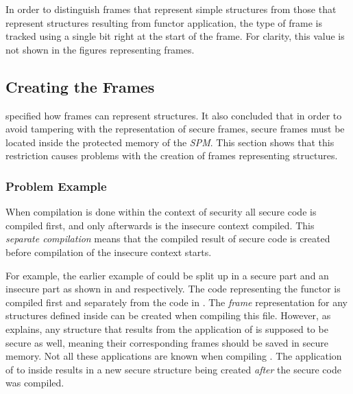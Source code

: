 In order to distinguish frames that represent simple structures from those that represent structures resulting from functor application, the type of frame is tracked using a single bit right at the start of the frame.
For clarity, this value is not shown in the figures representing frames.

\subsection{Creating the Frames}
\label{sec:creatingframes}
 specified how frames can represent structures.
It also concluded that in order to avoid tampering with the representation of secure frames, secure frames must be located inside the protected memory of the \emph{SPM}.
This section shows that this restriction causes problems with the creation of frames representing structures.

\subsubsection{Problem Example}
When compilation is done within the context of security all secure code is compiled first, and only afterwards is the insecure context compiled.
This \emph{separate compilation} means that the compiled result of secure code is created before compilation of the insecure context starts.

For example, the earlier example of  could be split up in a secure part and an insecure part as shown in  and  respectively.
The code representing the functor is compiled first and separately from the code in . 
The \emph{frame} representation for any structures defined inside  can be created when compiling this file.
However, as  explains, any structure that results from the application of  is supposed to be secure as well, meaning their corresponding frames should be saved in secure memory. 
Not all these applications are known when compiling .
The application of  to  inside  results in a new secure structure being created \emph{after} the secure code was compiled.

